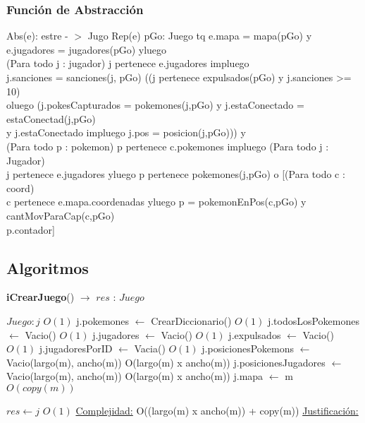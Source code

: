 \begin{Representacion}
\begin{enumerate}
	\end{enumerate}
	
\subsubsection{Funci\'on de Abstracci\'on}	
	Abs(e): estre - $>$ Jugo {Rep(e)} 
 pGo: Juego tq e.mapa = mapa(pGo) y e.jugadores = jugadores(pGo) yluego \\
 (Para todo j : jugador) j pertenece e.jugadores impluego 
 \\ j.sanciones = sanciones(j, pGo) ((j pertenece expulsados(pGo) y j.sanciones >= 10)\\
 oluego (j.pokesCapturados = pokemones(j,pGo) y j.estaConectado = estaConectad(j,pGo) \\
 y j.estaConectado impluego j.pos = posicion(j,pGo))) y \\
 (Para todo p : pokemon) p pertenece c.pokemones impluego (Para todo j : Jugador) \\
 j pertenece e.jugadores yluego p pertenece pokemones(j,pGo) o [(Para todo c : coord)\\
 c pertenece e.mapa.coordenadas yluego p = pokemonEnPos(c,pGo) y cantMovParaCap(c,pGo)\\
 p.contador]
\end{Representacion}


\subsection{Algoritmos}

\begin{algorithm}[H]{\textbf{iCrearJuego}() $\to$ $res$ : $Juego$}
	\begin{algorithmic}
		\State $Juego : j$	\Comment $O(1)$
		\State j.pokemones $\gets$ CrearDiccionario()	\Comment $O(1)$
		\State j.todosLosPokemones $\gets$ Vacio()	\Comment $O(1)$
		\State j.jugadores $\gets$ Vacio()	\Comment $O(1)$
		\State j.expulsados $\gets$ Vacio()	\Comment $O(1)$
		\State j.jugadoresPorID $\gets$ Vacia()	\Comment $O(1)$
		\State j.posicionesPokemons $\gets$	Vacio(largo(m), ancho(m))	\Comment O(largo(m) x ancho(m))
		\State j.posicionesJugadores $\gets$	Vacio(largo(m), ancho(m))	\Comment O(largo(m) x ancho(m))
		\State j.mapa $\gets$ m	\Comment $O(copy(m))$

		\State $res \gets j$ \Comment $O(1)$
		\medskip
		\Statex \underline{Complejidad:} O((largo(m) x ancho(m)) + copy(m))
		\Statex \underline{Justificación:} 

    \end{algorithmic}
\end{algorithm}

